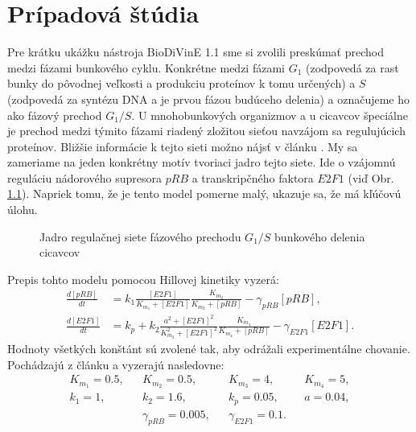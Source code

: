 \documentclass[11pt,final,oneside]{fithesis}
\begin{document}
\chapter{Pr\'ipadov\'a \v st\'udia}
Pre kr\'atku uk\'a\v zku n\'astroja BioDiVinE 1.1 sme si zvolili presk\'uma\v t prechod medzi f\'azami bunkov\'eho cyklu. Konkr\'etne medzi f\'azami $G_1$ 
(zodpoved\'a za rast bunky do p\^ ovodnej ve\v lkosti a produkciu prote\'inov k tomu ur\v cen\'ych) a $S$ (zodpoved\'a za synt\'ezu DNA a je prvou 
f\'azou bud\'uceho delenia) a ozna\v cujeme ho ako f\'azov\'y prechod $G_1/S$. U mnohobunkov\'ych organizmov a u cicavcov \v speci\'alne je prechod medzi t\'ymito f\'azami riaden\'y zlo\v zitou sie\v tou
navz\'ajom sa reguluj\'ucich prote\'inov. Bli\v z\v sie inform\'acie k tejto sieti mo\v zno n\'ajs\v t v \v cl\'anku \cite{Swat:2004}. My sa zameriame na
jeden konkr\'etny mot\'iv tvoriaci jadro tejto siete. Ide o vz\'ajomn\'u regul\'aciu n\'adorov\'eho supresora $pRB$ a transkrip\v cn\'eho faktora $E2F1$ 
(vi\v d Obr. \ref{fig:caseStudy}). Napriek tomu, \v ze je tento model pomerne mal\'y, ukazuje sa, \v ze m\'a k\v l\'u\v cov\'u \'ulohu.
\begin{figure}[h]
\centering
{}
\caption{Jadro regula\v cnej siete f\'azov\'eho prechodu $G_1/S$ bunkov\'eho delenia cicavcov}
\label{fig:caseStudy}
\end{figure}

Prepis tohto modelu pomocou Hillovej kinetiky vyzer\'a:
\begin{align}
\frac{d[pRB]}{dt} &= k_1 \frac{[E2F1]}{K_{m_1} + [E2F1]}\frac{K_{m_2}}{K_{m_2} + [pRB]} - \gamma_{pRB}[pRB],\\
\frac{d[E2F1]}{dt} &= k_p + k_2 \frac{a^2 + [E2F1]^2}{K_{m_3}^2 + [E2F1]^2}\frac{K_{m_4}}{K_{m_4} + [pRB]} - \gamma_{E2F1}[E2F1].
\end{align}
Hodnoty v\v setk\'ych kon\v st\'ant s\'u zvolen\'e tak, aby odr\'a\v zali experiment\'alne chovanie. Poch\'adzaj\'u z \v cl\'anku \cite{Swat:2004} a 
vyzeraj\'u nasledovne:
\begin{align}
&K_{m_1} = 0.5,& &K_{m_2} = 0.5,& &K_{m_3} = 4,& &K_{m_4} = 5,\\
&k_1 = 1,& &k_2 = 1.6,& &k_p = 0.05,& &a = 0.04,\\
& & &\gamma_{pRB} = 0.005,& &\gamma_{E2F1} = 0.1.& & &
\end{align}
\end{document}
